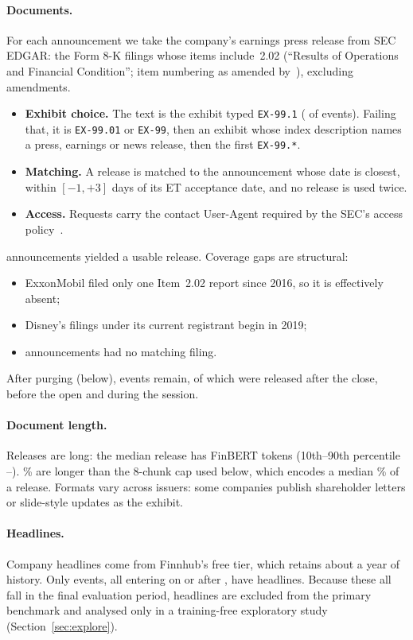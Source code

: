 \documentclass[11pt]{article}
\begin{document}
\paragraph{Documents.} For each announcement we take the company's earnings press release from
SEC EDGAR: the Form 8-K filings whose items include~2.02 (``Results of Operations and Financial
Condition''; item numbering as amended by~\citet{sec2004}), excluding amendments.
\begin{itemize}
  \item \textbf{Exhibit choice.} The text is the exhibit typed \texttt{EX-99.1}
  (\nExhibitStd{} of \nUsable{} events). Failing that, it is \texttt{EX-99.01} or
  \texttt{EX-99}, then an exhibit whose index description names a press, earnings or news
  release, then the first \texttt{EX-99.*}.
  \item \textbf{Matching.} A release is matched to the announcement whose date is closest,
  within $[-1, +3]$ days of its ET acceptance date, and no release is used twice.
  \item \textbf{Access.} Requests carry the contact User-Agent required by the SEC's access
  policy~\citep{secaccess}.
\end{itemize}
\nUsable{} announcements yielded a usable release. Coverage gaps are structural:
\begin{itemize}
  \item ExxonMobil filed only one Item~2.02 report since 2016, so it is effectively absent;
  \item Disney's filings under its current registrant begin in 2019;
  \item \nNoDocWindow{} announcements had no matching filing.
\end{itemize}
After purging (below), \nEvents{} events remain, of which \nAMC{} were released after the close,
\nBMO{} before the open and \nDMH{} during the session.
\paragraph{Document length.} Releases are long: the median release has \tokMedian{} FinBERT tokens
(10th--90th percentile \tokPten--\tokPninety). \shareOverEight\% are longer than the 8-chunk cap
used below, which encodes a median \shareEncodedEight\% of a release. Formats vary across issuers:
some companies publish shareholder letters or slide-style updates as the exhibit.
\paragraph{Headlines.} Company headlines come from Finnhub's free tier, which retains about a year of
history. Only \nHeadlineEvents{} events, all entering on or after \firstHeadlineEntry{}, have
headlines. Because these all fall in the final evaluation period, headlines are excluded from the
primary benchmark and analysed only in a training-free exploratory study
(Section~\ref{sec:explore}).
\end{document}
